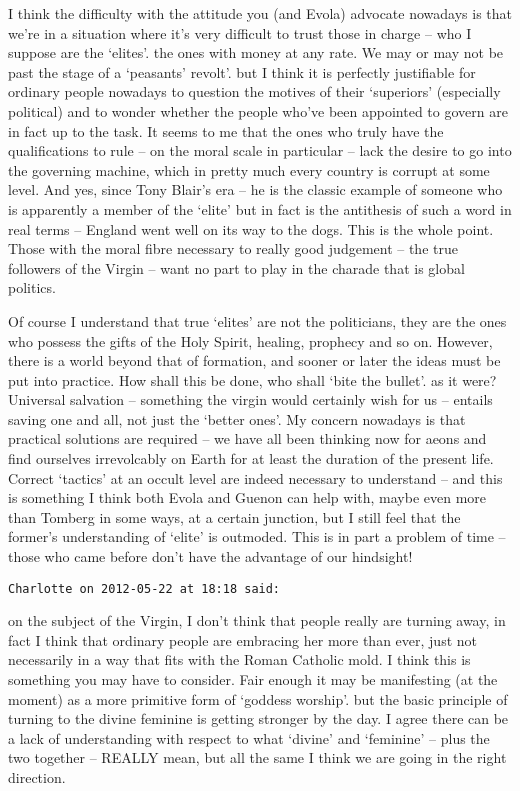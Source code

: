 \begin{footnotesize}
\begin{sffamily}
I think the difficulty with the attitude you (and Evola) advocate nowadays is that we're in a situation where it's very difficult to trust those in charge – who I suppose are the `elites'. the ones with money at any rate. We may or may not be past the stage of a `peasants' revolt'. but I think it is perfectly justifiable for ordinary people nowadays to question the motives of their `superiors' (especially political) and to wonder whether the people who've been appointed to govern are in fact up to the task. It seems to me that the ones who truly have the qualifications to rule – on the moral scale in particular – lack the desire to go into the governing machine, which in pretty much every country is corrupt at some level. And yes, since Tony Blair's era – he is the classic example of someone who is apparently a member of the `elite' but in fact is the antithesis of such a word in real terms – England went well on its way to the dogs. This is the whole point. Those with the moral fibre necessary to really good judgement – the true followers of the Virgin – want no part to play in the charade that is global politics.

Of course I understand that true `elites' are not the politicians, they are the ones who possess the gifts of the Holy Spirit, healing, prophecy and so on. However, there is a world beyond that of formation, and sooner or later the ideas must be put into practice. How shall this be done, who shall `bite the bullet'. as it were? Universal salvation – something the virgin would certainly wish for us – entails saving one and all, not just the `better ones'. My concern nowadays is that practical solutions are required – we have all been thinking now for aeons and find ourselves irrevolcably on Earth for at least the duration of the present life. Correct `tactics' at an occult level are indeed necessary to understand – and this is something I think both Evola and Guenon can help with, maybe even more than Tomberg in some ways, at a certain junction, but I still feel that the former's understanding of `elite' is outmoded. This is in part a problem of time – those who came before don't have the advantage of our hindsight!


\hfill

\texttt{Charlotte on 2012-05-22 at 18:18 said: }

on the subject of the Virgin, I don't think that people really are turning away, in fact I think that ordinary people are embracing her more than ever, just not necessarily in a way that fits with the Roman Catholic mold. I think this is something you may have to consider. Fair enough it may be manifesting (at the moment) as a more primitive form of `goddess worship'. but the basic principle of turning to the divine feminine is getting stronger by the day. I agree there can be a lack of understanding with respect to what `divine' and `feminine’ – plus the two together – REALLY mean, but all the same I think we are going in the right direction. 


\end{sffamily}
\end{footnotesize}
